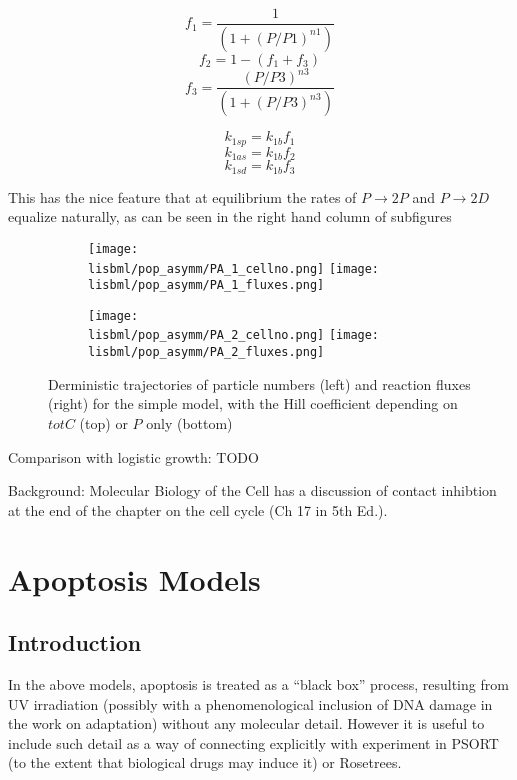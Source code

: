 \documentclass[a4paper,10pt]{report}
\newcommand{\psortbase}{/home/ngrs2/work/bsu/PSORT_Zuliani_Reynolds/}
\newcommand{\sbmlbase}{\psortbase/sbml-sh/}
\newcommand{\lisbml}{\sbmlbase/li_like}
\begin{document}
\[
f_1 = \frac{1}{(1 + (P/P1)^{n1})}
\]
\[
f_2 = 1 - (f_1 + f_3)
\]
\[
f_3 = \frac{(P/P3)^{n3}}{(1 + (P/P3)^{n3})}
\]

\[
k_{1sp} = k_{1b} f_1
\]
\[
k_{1as} = k_{1b} f_2 
\]
\[
k_{1sd} = k_{1b} f_3 
\]



This has the nice feature that at equilibrium the rates of $P \rightarrow 2P$ 
and $P \rightarrow 2D$ equalize naturally, as can be seen in the right hand column of subfigures 



\begin{figure}[h!]
  \begin{subfigure}{\textwidth}
    \texttt{[image: \\lisbml/pop\_asymm/PA\_1\_cellno.png]}
    \texttt{[image: \\lisbml/pop\_asymm/PA\_1\_fluxes.png]}
  \end{subfigure}
  \begin{subfigure}{\textwidth}
    \texttt{[image: \\lisbml/pop\_asymm/PA\_2\_cellno.png]}
    \texttt{[image: \\lisbml/pop\_asymm/PA\_2\_fluxes.png]}
  \end{subfigure}
  \caption{Derministic trajectories of particle numbers (left) and reaction fluxes (right) for the simple model, with the Hill coefficient depending on $totC$ (top) or $P$ only (bottom)}
  \label{fig:joneslike_hill_osc_PortotC}
\end{figure}
 


Comparison with logistic growth: TODO

Background: Molecular Biology of the Cell \cite{alberts2008molecular} has a discussion of contact inhibtion at the end of the chapter on the cell cycle (Ch 17 in 5th Ed.). 



\chapter{Apoptosis Models}

\section{Introduction}


In the above models, apoptosis is treated as a ``black box'' process, resulting from UV irradiation (possibly with a phenomenological inclusion of DNA damage in the work on adaptation) without any molecular detail. However it is useful to include such detail as a way of connecting explicitly with experiment in PSORT (to the extent that biological drugs may induce it) or Rosetrees.
\end{document}
